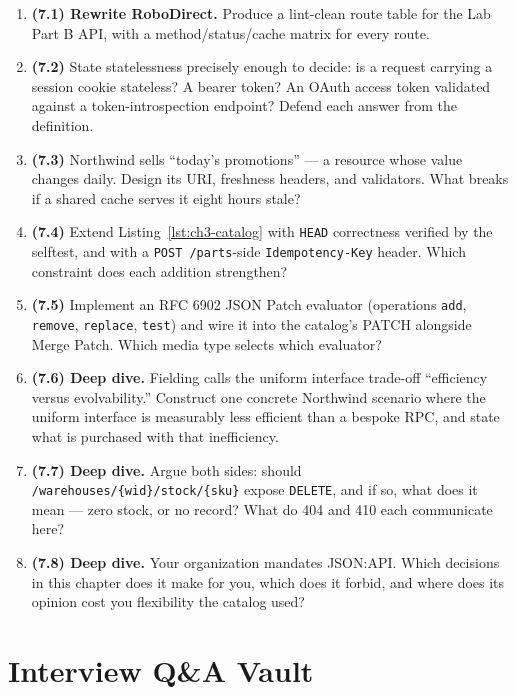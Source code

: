 \begin{enumerate}
  \item \textbf{(7.1) Rewrite RoboDirect.} Produce a lint-clean route table for
        the Lab Part B API, with a method/status/cache matrix for every route.
  \item \textbf{(7.2)} State statelessness precisely enough to decide: is a
        request carrying a session cookie stateless? A bearer token? An OAuth
        access token validated against a token-introspection endpoint? Defend
        each answer from the definition.
  \item \textbf{(7.3)} Northwind sells ``today's promotions'' --- a resource
        whose value changes daily. Design its URI, freshness headers, and
        validators. What breaks if a shared cache serves it eight hours stale?
  \item \textbf{(7.4)} Extend Listing~\ref{lst:ch3-catalog} with
        \texttt{HEAD} correctness verified by the selftest, and with a
        \texttt{POST /parts}-side \texttt{Idempotency-Key} header. Which
        constraint does each addition strengthen?
  \item \textbf{(7.5)} Implement an RFC 6902 JSON Patch evaluator (operations
        \texttt{add}, \texttt{remove}, \texttt{replace}, \texttt{test}) and wire
        it into the catalog's PATCH alongside Merge Patch. Which media type
        selects which evaluator?
  \item \textbf{(7.6) Deep dive.} Fielding calls the uniform interface
        trade-off ``efficiency versus evolvability.'' Construct one concrete
        Northwind scenario where the uniform interface is measurably less
        efficient than a bespoke RPC, and state what is purchased with that
        inefficiency.
  \item \textbf{(7.7) Deep dive.} Argue both sides: should
        \texttt{/warehouses/\{wid\}/stock/\{sku\}} expose \texttt{DELETE}, and
        if so, what does it mean --- zero stock, or no record? What do 404 and
        410 each communicate here?
  \item \textbf{(7.8) Deep dive.} Your organization mandates JSON:API. Which
        decisions in this chapter does it make for you, which does it forbid,
        and where does its opinion cost you flexibility the catalog used?
\end{enumerate}

\section{Interview Q\&A Vault}
\label{sec:ch3-qa}

